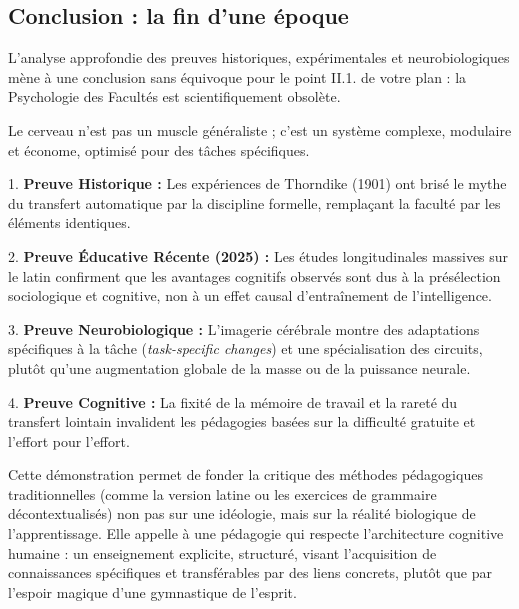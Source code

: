 \subsection{Conclusion : la fin d'une époque}

L'analyse approfondie des preuves historiques, expérimentales et neurobiologiques mène à une
conclusion sans équivoque pour le point II.1.\cite{II-1-1-ref1} de votre plan : la Psychologie des
Facultés est scientifiquement obsolète.

Le cerveau n'est pas un muscle généraliste ; c'est un système complexe, modulaire et économe,
optimisé pour des tâches spécifiques.

1. \textbf{Preuve Historique :} Les expériences de Thorndike (1901) ont brisé le mythe du transfert
automatique par la discipline formelle, remplaçant la \og faculté\fg{} par les \og éléments
identiques\fg{}.

2. \textbf{Preuve Éducative Récente (2025) :} Les études longitudinales massives sur le latin
confirment que les avantages cognitifs observés sont dus à la présélection sociologique et
cognitive, non à un effet causal d'entraînement de l'intelligence.

3. \textbf{Preuve Neurobiologique :} L'imagerie cérébrale montre des adaptations spécifiques à la
tâche (\textit{task-specific changes}) et une spécialisation des circuits, plutôt qu'une
augmentation globale de la \og masse\fg{} ou de la puissance neurale.

4. \textbf{Preuve Cognitive :} La fixité de la mémoire de travail et la rareté du transfert lointain
invalident les pédagogies basées sur la difficulté gratuite et l'effort pour l'effort.

Cette démonstration permet de fonder la critique des méthodes pédagogiques traditionnelles (comme la
version latine ou les exercices de grammaire décontextualisés) non pas sur une idéologie, mais sur
la réalité biologique de l'apprentissage. Elle appelle à une pédagogie qui respecte l'architecture
cognitive humaine : un enseignement explicite, structuré, visant l'acquisition de connaissances
spécifiques et transférables par des liens concrets, plutôt que par l'espoir magique d'une \og
gymnastique\fg{} de l'esprit.

